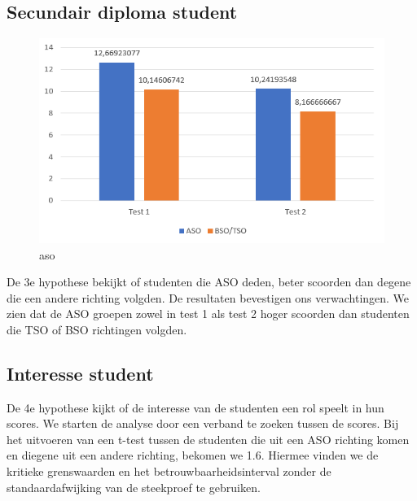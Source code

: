 \documentclass{hogent-article}
\begin{document}
	\subsection{Secundair diploma student}
	\begin{figure}[H]
		\includegraphics[width=\linewidth]{img/aso.png}
		\caption{aso}
	\end{figure}
	De 3e hypothese bekijkt of studenten die ASO deden, beter scoorden dan degene die een andere richting volgden. De resultaten bevestigen ons verwachtingen. We zien dat de ASO groepen zowel in test 1 als test 2 hoger scoorden dan studenten die TSO of BSO richtingen volgden.
	
	
	
	\subsection{Interesse student}
	De 4e hypothese kijkt of de interesse van de studenten een rol speelt in hun scores. We starten de analyse door een verband te zoeken tussen de scores. Bij het uitvoeren van een t-test tussen de studenten die uit een ASO richting komen en diegene uit een andere richting, bekomen we 1.6. Hiermee vinden we de kritieke grenswaarden en het betrouwbaarheidsinterval zonder de standaardafwijking van de steekproef te gebruiken.
    
	
	
\end{document}
